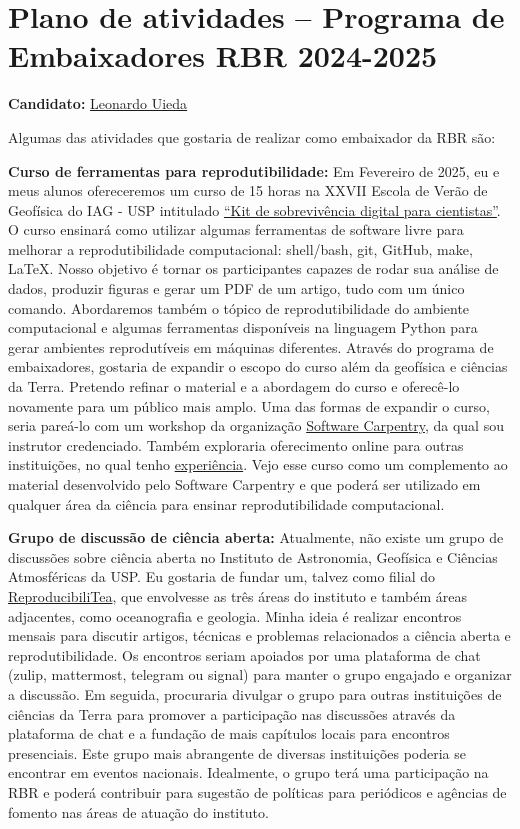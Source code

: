 \documentclass[a4paper,onecolumn,10pt]{article}
\newcommand{\Padding}{\vspace{0.5cm}}
\begin{document}
\section*{Plano de atividades -- Programa de Embaixadores RBR 2024-2025}

\noindent
\textbf{Candidato:} \href{https://www.leouieda.com}{Leonardo Uieda}
\Padding


\noindent
Algumas das atividades que gostaria de realizar como embaixador da RBR são:

\Padding
\noindent
\textbf{Curso de ferramentas para reprodutibilidade:}
Em Fevereiro de 2025, eu e meus alunos ofereceremos um curso de 15 horas na
XXVII Escola de Verão de Geofísica do IAG - USP intitulado
\href{https://github.com/compgeolab/kit}{``Kit de sobrevivência digital
para cientistas''}. O curso ensinará como utilizar algumas ferramentas de software livre para melhorar a reprodutibilidade
computacional: shell/bash, git, GitHub, make, LaTeX. Nosso objetivo é
tornar os participantes capazes de rodar sua análise de dados, produzir
figuras e gerar um PDF de um artigo, tudo com um único comando. Abordaremos
também o tópico de reprodutibilidade do ambiente computacional e algumas
ferramentas disponíveis na linguagem Python para gerar ambientes reprodutíveis
em máquinas diferentes.
Através do programa de embaixadores, gostaria de expandir o escopo do curso
além da geofísica e ciências da Terra.
Pretendo refinar o material e a abordagem do curso e oferecê-lo novamente
para um público mais amplo.
Uma das formas de expandir o curso, seria pareá-lo com um workshop da
organização \href{https://software-carpentry.org/}{Software Carpentry}, da qual
sou instrutor credenciado.
Também exploraria oferecimento online para outras instituições, no qual tenho
\href{https://www.leouieda.com/cv/#5}{experiência}.
Vejo esse curso como um complemento ao material desenvolvido pelo Software
Carpentry e que poderá ser utilizado em qualquer área da ciência para ensinar
reprodutibilidade computacional.

\Padding
\noindent
\textbf{Grupo de discussão de ciência aberta:}
Atualmente, não existe um grupo de discussões sobre ciência aberta no
Instituto de Astronomia, Geofísica e Ciências Atmosféricas da USP. Eu gostaria
de fundar um, talvez como filial do
\href{https://reproducibilitea.org/}{ReproducibiliTea}, que envolvesse as três
áreas do instituto e também áreas adjacentes, como oceanografia e geologia.
Minha ideia é realizar encontros mensais para discutir artigos,
técnicas e problemas relacionados a ciência aberta e reprodutibilidade. Os
encontros seriam apoiados por uma plataforma de chat (zulip, mattermost,
telegram ou signal) para manter o grupo engajado e organizar a discussão. Em
seguida, procuraria divulgar o grupo para outras instituições de ciências da
Terra para promover a participação nas discussões através da plataforma de chat
e a fundação de mais capítulos locais para encontros presenciais.
Este grupo mais abrangente de diversas instituições poderia se encontrar em
eventos nacionais.
Idealmente, o grupo terá uma participação na RBR e poderá contribuir para
sugestão de políticas para periódicos e agências de fomento nas áreas de
atuação do instituto.
\end{document}
